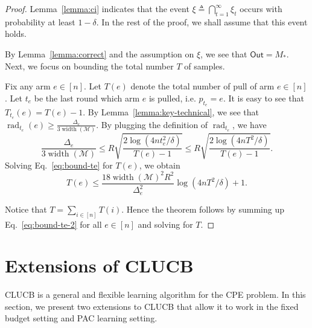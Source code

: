 \documentclass{article}
\newcommand{\Algorithm}{{\small \textsf{CLUCB}}\xspace}
\newcommand{\Problem}{{CPE}\xspace}
\newcommand{\M}{\mathcal M}
\DeclareMathOperator{\rank}{width}
\DeclareMathOperator{\rad}{rad}
\newcommand{\out}{\mathsf{Out}}
\begin{document}
\begin{proof}
Lemma~\ref{lemma:ci} indicates that the event $\xi \triangleq \bigcap_{t=1}^\infty \xi_t$ occurs with probability at least $1-\delta$.
In the rest of the proof, we shall assume that this event holds.

By Lemma~\ref{lemma:correct} and the assumption on $\xi$, we see that $\out=M_*$.
Next, we focus on bounding the total number $T$ of samples.

Fix any arm $e\in [n]$.
Let $T(e)$ denote the total number of pull of arm $e\in [n]$.
Let $t_e$ be the last round which arm $e$ is pulled, i.e. $p_{t_e} = e$. 
It is easy to see that 
$T_{t_e}(e) = T(e) - 1$.
By Lemma~\ref{lemma:key-technical}, we see that 
$\rad_{t_e}(e) \ge \frac{\Delta_e}{3\rank(\M)}$.
By plugging the definition of $\rad_{t_e}$, we have
\begin{equation}
\frac{\Delta_e}{3\rank(\M)} \le 
R\sqrt{\frac{2\log\left(4n t_e^2/\delta\right)}{T(e)-1}} \le
R\sqrt{\frac{2\log\left(4n T^2/\delta\right)}{T(e)-1}}.
\label{eq:bound-te}
\end{equation}
Solving Eq.~\eqref{eq:bound-te} for $T(e)$, we obtain
\begin{equation}
\label{eq:bound-te-2}
T(e) \le \frac{18 \rank(\M)^2 R^2}{\Delta_e^2} \log(4nT^2/\delta)+1.
\end{equation}

Notice that $T=\sum_{i\in[n]} T(i)$. 
Hence the theorem follows by summing up Eq.~\eqref{eq:bound-te-2} for all $e\in [n]$ and solving for $T$.
\end{proof}


\section{Extensions of \Algorithm}
\label{section:extensions}

\Algorithm is a general and flexible learning algorithm for the \Problem problem.
In this section, we present two extensions to \Algorithm that allow it to work in the fixed budget setting and PAC learning setting.
\end{document}
